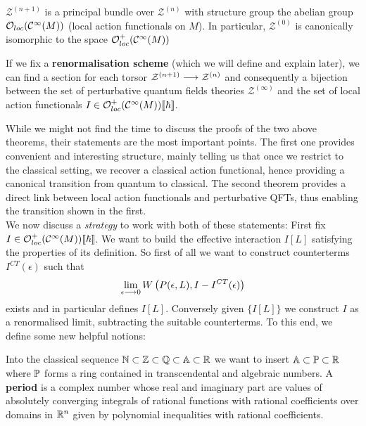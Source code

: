 \begin{theo}
  $\mathcal{Z}^{(n+1)}$ is a principal bundle over $\mathcal{Z}^{(n)}$ with structure group the abelian group $\mathcal{O}_{loc}(\mathcal{C}^{\infty}(M))$ (local action functionals on $M$). In particular, $\mathcal{Z}^{(0)}$ is canonically isomorphic to the space $\mathcal{O}^+_{loc}(\mathcal{C}^{\infty}(M))$
\end{theo}

\begin{theo}
  If we fix a \textbf{renormalisation scheme} (which we will define and explain later), we can find a section for each torsor $\mathcal{Z}^{(n+1)} \longrightarrow \mathcal{Z}^{(n)}$ and consequently a bijection between the set of perturbative quantum fields theories $\mathcal{Z}^{(\infty)}$ and the set of local action functionals $I \in \mathcal{O}^+_{loc}(\mathcal{C}^{\infty}(M))\llbracket \hbar \rrbracket$.
\end{theo}

While we might not find the time to discuss the proofs of the two above theorems, their statements are the most important points. The first one provides convenient and interesting structure, mainly telling us that once we restrict to the classical setting, we recover a classical action functional, hence providing a canonical transition from quantum to classical. The second theorem provides a direct link between local action functionals and perturbative QFTs, thus enabling the transition shown in the first.\\

We now discuss a \textit{strategy} to work with both of these statements: First fix $I \in \mathcal{O}^+_{loc}(\mathcal{C}^{\infty}(M))\llbracket \hbar \rrbracket$. We want to build the effective interaction $I[L]$ satisfying the properties of its definition. So first of all we want to construct counterterms $I^{CT}(\epsilon)$ such that
\begin{equation} \lim_{\epsilon \lra 0} W\left(P(\epsilon,L), I-I^{CT}(\epsilon)\right)\end{equation}
exists and in particular defines $I[L]$. Conversely given $\{I[L]\}$ we construct $I$ as a renormalised limit, subtracting the suitable counterterms. To this end, we define some new helpful notions:

\begin{definition}[Periods]
  Into the classical sequence $\mathbb{N} \subset \mathbb{Z} \subset \mathbb{Q} \subset \mathbb{A} \subset \mathbb{R}$ we want to insert $\mathbb{A} \subset \mathbb{P} \subset \mathbb{R}$ where $\mathbb{P}$ forms a ring contained in transcendental and algebraic numbers. A \textbf{period} is a complex number whose real and imaginary part are values of absolutely converging integrals of rational functions with rational coefficients over domains in $\mathbb{R}^n$ given by polynomial inequalities with rational coefficients.
\end{definition}

